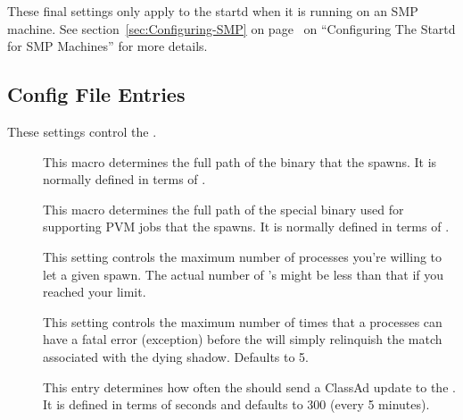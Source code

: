 These final settings only apply to the startd when it is running on an
SMP machine. 
See section~\ref{sec:Configuring-SMP} on
page~\pageref{sec:Configuring-SMP} on ``Configuring The Startd for 
SMP Machines'' for more details.


\subsection{\label{sec:Schedd-Config-File-Entries}
 Config File Entries}

These settings control the .
\begin{description}

\item[] \label{param:Shadow} This macro determines the
  full path of the  binary that the 
  spawns.  It is normally defined in terms of . 
  
\item[] \label{param:ShadowPvm} This macro
  determines the full path of the special  binary
  used for supporting PVM jobs that the  spawns.  It is
  normally defined in terms of .

\item[] \label{param:MaxJobsRunning} This
  setting controls the maximum number of  processes
  you're willing to let a given  spawn.  The actual
  number of 's might be less than that if you reached
  your  limit.

\item[]
  \label{param:MaxShadowExceptions} This setting controls the maximum
  number of times that a  processes can have a fatal
  error (exception) before the  will simply relinquish
  the match associated with the dying shadow.  Defaults to 5.

\item[] \label{param:ScheddInterval}  This
  entry determines how often the  should send a ClassAd
  update to the .  It is defined in terms of seconds
  and defaults to 300 (every 5 minutes).
  

\end{description}
